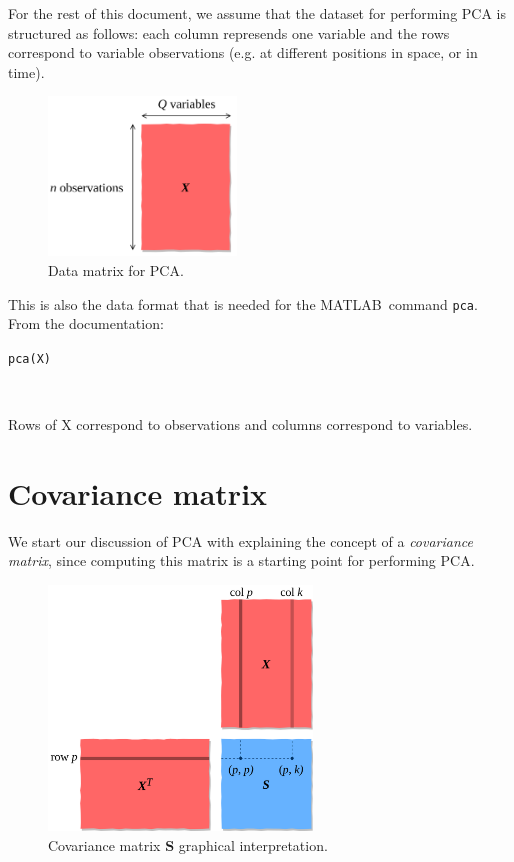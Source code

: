 \documentclass[10pt,twocolumn]{article}
\begin{document}
For the rest of this document, we assume that the dataset for performing PCA is structured as follows: each column represends one variable and the rows correspond to variable observations (e.g. at different positions in space, or in time).

\begin{figure}[H]
\centering\includegraphics[width=5cm]{data-set-PCA.png}
\caption{Data matrix for PCA.}
\label{fig:data-matrix}
\end{figure}

This is also the data format that is needed for the MATLAB\textregistered \, command \texttt{pca}. From the documentation:


\begin{framed}
\texttt{pca(X)}

\,\,

Rows of X correspond to observations and columns correspond to variables.
\end{framed}

\section{Covariance matrix}

We start our discussion of PCA with explaining the concept of a \textit{covariance matrix}, since computing this matrix is a starting point for performing PCA.

\begin{figure}[H]
\centering\includegraphics[width=7cm]{cov-matrix.png}
\caption{Covariance matrix $\bm{S}$ graphical interpretation.}
\label{fig:covariance-matrix}
\end{figure}
\end{document}
